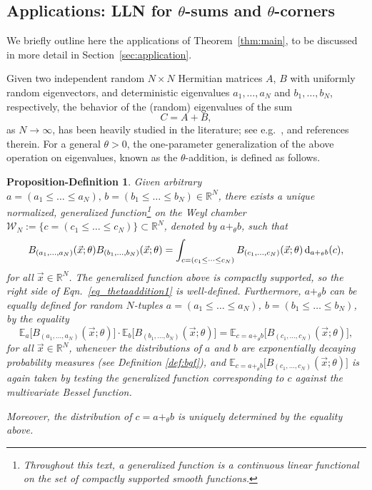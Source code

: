 \documentclass[11pt]{article}
\theoremstyle{plain}
\newtheorem{proposition-definition}[lemma]{Proposition-Definition}
\newcommand{\R}{\mathbb R}
\newcommand{\E}{\mathbb E}
\renewcommand{\d}{\textrm d}
\newcommand{\vecx}{\vec{x}}
\begin{document}
\subsection{Applications: LLN for $\theta$-sums and $\theta$-corners}


We briefly outline here the applications of Theorem~\ref{thm:main}, to be discussed in more detail in Section~\ref{sec:application}.

\smallskip

Given two independent random $N\times N$ Hermitian matrices $A$, $B$ with uniformly random eigenvectors, and deterministic eigenvalues $a_1,\dots,a_N$ and $b_1,\dots,b_N$, respectively, the behavior of the (random) eigenvalues of the sum
$$C=A+B,$$
as $N\rightarrow\infty$, has been heavily studied in the literature; see e.g.~\cite{Voi91,B1,BCG}, and references therein.
For a general $\theta>0$, the one-parameter generalization of the above operation on eigenvalues, known as the $\theta$-addition, is defined as follows.

\begin{proposition-definition}
Given arbitrary $a=(a_1\le\dots\le a_N),\,b=(b_1\le\dots\le b_N)\in\R^N$, there exists a unique normalized, generalized function\footnote{Throughout this text, a \emph{generalized function} is a continuous linear functional on the set of compactly supported smooth functions.} on the Weyl chamber $\mathcal{W}_N:=\{c=(c_1\le\dots\le c_N)\}\subset\R^N$, denoted by $a+_\theta b$, such that
\begin{equation}\label{eq_thetaaddition1}
    B_{(a_1,\dots,a_N)}(\vecx;\theta)B_{(b_1,\dots,b_N)}(\vecx;\theta) = \int_{c=(c_1\le\dots\le c_N)} B_{(c_1,\dots,c_N)}(\vecx;\theta)\,\d_{a+_\theta b}(c),
\end{equation}
for all $\vecx\in\R^N$.
The generalized function above is compactly supported, so the right side of Eqn.~\eqref{eq_thetaaddition1} is well-defined.
Furthermore, $a+_\theta b$ can be equally defined for random $N$-tuples $a=(a_1\le\dots\le a_N)$, $b=(b_1\le\dots\le b_N)$, by the equality
\begin{equation}\label{eq_thetaaddition2}
\E_a\Big[ B_{(a_1,\dots,a_N)}(\vecx;\theta) \Big]
\cdot\E_{b}\Big[ B_{(b_1,\dots,b_N)}(\vecx;\theta) \Big]
= \E_{c=a+_\theta b} \Big[ B_{(c_1,\dots,c_N)}(\vecx;\theta) \Big],
\end{equation}
for all $\vecx\in\R^N$, whenever the distributions of $a$ and $b$ are exponentially decaying probability measures (see Definition \ref{def:bgf}), and $\E_{c=a+_\theta b} \Big[ B_{(c_1,\dots,c_N)}(\vecx;\theta)\Big]$ is again taken by testing the generalized function corresponding to $c$ against the multivariate Bessel function.

Moreover, the distribution of $c=a+_{\theta}b$ is uniquely determined by the equality above.
\end{proposition-definition}
\end{document}
